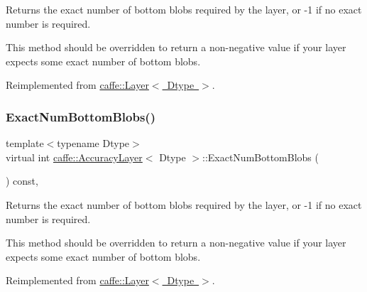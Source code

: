 Returns the exact number of bottom blobs required by the layer, or -\/1 if no exact number is required. 

This method should be overridden to return a non-\/negative value if your layer expects some exact number of bottom blobs. 

Reimplemented from \mbox{\hyperlink{classcaffe_1_1_layer_a8e5ee0494d85f5f55fc4396537cbc60f}{caffe\+::\+Layer$<$ Dtype $>$}}.

\mbox{\label{classcaffe_1_1_accuracy_layer_afb0d3db8e4a18bec0e05d54d11453ef1}} 
\subsubsection{\texorpdfstring{Exact\+Num\+Bottom\+Blobs()}{ExactNumBottomBlobs()}\hspace{0.1cm}{\footnotesize\ttfamily [2/2]}}
{\footnotesize\ttfamily template$<$typename Dtype$>$ \\
virtual int \mbox{\hyperlink{classcaffe_1_1_accuracy_layer}{caffe\+::\+Accuracy\+Layer}}$<$ Dtype $>$\+::Exact\+Num\+Bottom\+Blobs (\begin{DoxyParamCaption}{ }\end{DoxyParamCaption}) const\hspace{0.3cm}{\ttfamily [inline]}, {\ttfamily [virtual]}}



Returns the exact number of bottom blobs required by the layer, or -\/1 if no exact number is required. 

This method should be overridden to return a non-\/negative value if your layer expects some exact number of bottom blobs. 

Reimplemented from \mbox{\hyperlink{classcaffe_1_1_layer_a8e5ee0494d85f5f55fc4396537cbc60f}{caffe\+::\+Layer$<$ Dtype $>$}}.

\mbox{\label{classcaffe_1_1_accuracy_layer_a61a6592772a54c1694da338b2d50b5f8}} 
